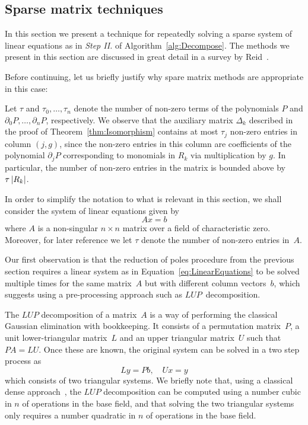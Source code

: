 
\subsection{Sparse matrix techniques}
\label{sec:01-05-sparse}

In this section we present a technique for repeatedly solving a sparse 
system of linear equations as in {\it Step II.} of 
Algorithm~\ref{alg:Decompose}.  The methods we present in this section are 
discussed in great detail in a survey by Reid~\citep{Rei76}.

Before continuing, let us briefly justify why spare matrix methods are 
appropriate in this case:

\begin{rem}
Let $\tau$ and $\tau_0, \dotsc, \tau_n$ denote the number of non-zero 
terms of the polynomials $P$ and $\partial_0 P, \dotsc, \partial_n P$, 
respectively.  We observe that the auxiliary matrix $\Delta_k$ described in 
the proof of Theorem~\ref{thm:Isomorphism} contains at most $\tau_j$ 
non-zero entries in column $(j, g)$, since the non-zero entries in this column 
are coefficients of the polynomial $\partial_j P$ corresponding to monomials 
in $R_k$ via multiplication by $g$.  In particular, the number of non-zero 
entries in the matrix is bounded above by $\tau \left\lvert R_k\right\rvert$.
\end{rem}

\begin{notation}
In order to simplify the notation to what is relevant in this section, we 
shall consider the system of linear equations given by 
\begin{equation} \label{eq:LinearEquations}
A x = b
\end{equation}
where $A$ is a non-singular $n \times n$ matrix over a field of characteristic 
zero.  Moreover, for later reference we let $\tau$ denote the number of 
non-zero entries in~$A$.
\end{notation}

Our first observation is that the reduction of poles procedure from the 
previous section requires a linear system as in 
Equation~\eqref{eq:LinearEquations} to be solved multiple times for the same 
matrix~$A$ but with different column vectors~$b$, which suggests using a 
pre-processing approach such as $LUP$~decomposition.

The $LUP$ decomposition of a matrix~$A$ is a way of performing the 
classical Gaussian elimination with bookkeeping.  It consists of a 
permutation matrix~$P$, a unit lower-triangular matrix~$L$ and an upper 
triangular matrix~$U$ such that $PA = LU$.  Once these are known, the 
original system can be solved in a two step process as
\begin{equation}
L y = P b, \quad U x = y
\end{equation}
which consists of two triangular systems.  We briefly note that, using a 
classical dense approach~\citep{Cor90}, the $LUP$ decomposition can be 
computed using a number cubic in $n$ of operations in the base field, and 
that solving the two triangular systems only requires a number quadratic in 
$n$ of operations in the base field.


